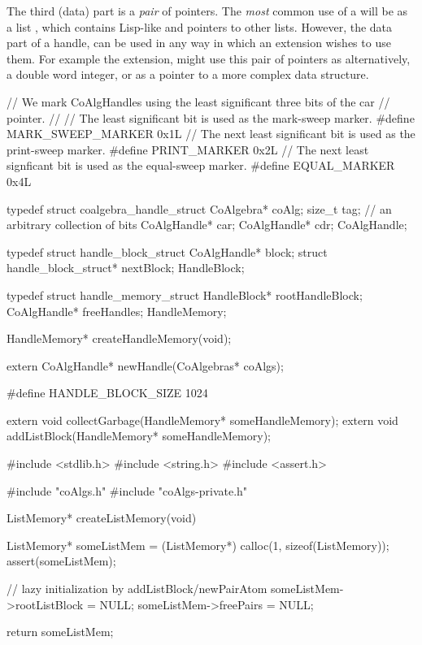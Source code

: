 The third (data) part is a \emph{pair} of  pointers. 
The \emph{most} common use of a  will be as a list 
, which contains Lisp-like  and  pointers 
to other lists. However, the data part of a handle, can be used in any way 
in which an extension wishes to use them. For example the  
extension, might use this pair of pointers as alternatively, a double word 
integer, or as a pointer to a more complex data structure. 

\startCHeader
// We mark CoAlgHandles using the least significant three bits of the car
// pointer.
//
// The least significant bit is used as the mark-sweep marker.
#define MARK_SWEEP_MARKER       0x1L
// The next least significant bit is used as the print-sweep marker.
#define PRINT_MARKER            0x2L
// The next least signficant bit is used as the equal-sweep marker.
#define EQUAL_MARKER            0x4L

typedef struct coalgebra_handle_struct {
  CoAlgebra*   coAlg;
  size_t       tag;  // an arbitrary collection of bits
  CoAlgHandle* car;
  CoAlgHandle* cdr;
} CoAlgHandle;

typedef struct handle_block_struct {
  CoAlgHandle* block;
  struct handle_block_struct* nextBlock;
} HandleBlock;

typedef struct handle_memory_struct {
  HandleBlock* rootHandleBlock;
  CoAlgHandle* freeHandles;
} HandleMemory;

HandleMemory* createHandleMemory(void);

extern CoAlgHandle* newHandle(CoAlgebras* coAlgs);
\stopCHeader

\startCHeader
#define HANDLE_BLOCK_SIZE 1024

extern void collectGarbage(HandleMemory* someHandleMemory);
extern void addListBlock(HandleMemory* someHandleMemory);
\stopCHeader

\startCCode
#include <stdlib.h>
#include <string.h>
#include <assert.h>

#include "coAlgs.h"
#include "coAlgs-private.h"

ListMemory* createListMemory(void) {
  ListMemory* someListMem = (ListMemory*) calloc(1, sizeof(ListMemory));
  assert(someListMem);

  // lazy initialization by addListBlock/newPairAtom
  someListMem->rootListBlock = NULL;
  someListMem->freePairs     = NULL;

  return someListMem;
}

